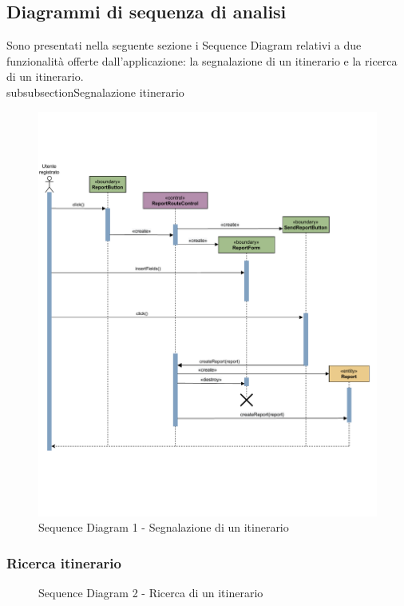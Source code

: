 \documentclass{natourDoc}
\begin{document}
\subsection{Diagrammi di sequenza di analisi}
Sono presentati nella seguente sezione i Sequence Diagram relativi a due funzionalità offerte dall'applicazione:
la segnalazione di un itinerario e la ricerca di un itinerario.
\\subsubsection{Segnalazione itinerario}
\begin{figure}[!htbp]
	\centering
	\includegraphics[width=\textwidth, page=1]{./diagrams/sequenceDomain-segnalazioneItinerario.pdf}
	\caption{Sequence Diagram 1 - Segnalazione di un itinerario}
\end{figure}
\FloatBarrier

\newpage
\subsubsection{Ricerca itinerario}
\begin{figure}[!htbp]
	\centering
	
	\caption{Sequence Diagram 2 - Ricerca di un itinerario}
\end{figure}
\FloatBarrier
\end{document}
